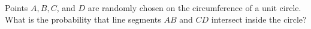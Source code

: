 Points $A, B, C$, and $D$ are randomly chosen on the circumference of a unit circle. What is the probability that line segments $AB$ and $CD$ intersect inside the circle?
